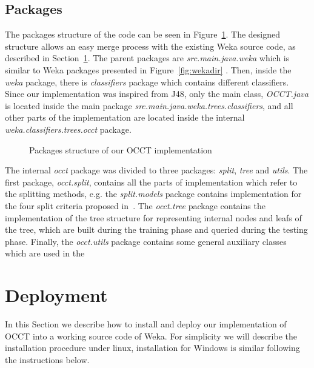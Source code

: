 \documentclass[a4paper,12pt]{article}
\begin{document}
\begin{spacing}{1.5}
\subsection{Packages}
The packages structure of the code can be seen in Figure~\ref{fig:packages}. The designed structure allows an easy merge process with the existing Weka source code, as described in Section~\ref{sec:deployment}. The parent packages are {\em src.main.java.weka} which is similar to Weka packages presented in Figure~\ref{fig:wekadir} . Then, inside the {\em weka} package, there is {\em classifiers} package which contains different classifiers. Since our implementation was inspired from J48, only the main class, {\em OCCT.java} is located inside the main package {\em src.main.java.weka.trees.classifiers}, and all other parts of the implementation are located inside the internal {\em weka.classifiers.trees.occt} package.
\begin{figure}[!h]
    \caption{Packages structure of our OCCT implementation}
    \label{fig:packages}
\end{figure}

The internal {\em occt} package was divided to three packages: {\em split}, {\em tree} and {\em utils}. The first package, {\em occt.split}, contains all the parts of implementation which refer to the splitting methods, e.g. the {\em split.models} package contains implementation for the four split criteria proposed in~\cite{dror2011thesis,dror2014occt}. The {\em occt.tree} package contains the implementation of the tree structure for representing internal nodes and leafs of the tree, which are built during the training phase and queried during the testing phase. Finally, the {\em occt.utils} package contains some general auxiliary classes which are used in the

\section{Deployment}\label{sec:deployment}
In this Section we describe how to install and deploy our implementation of OCCT into a working source code of Weka. For simplicity we will describe the installation procedure under linux, installation for Windows is similar following the instructions below.


\end{spacing}
\end{document}
